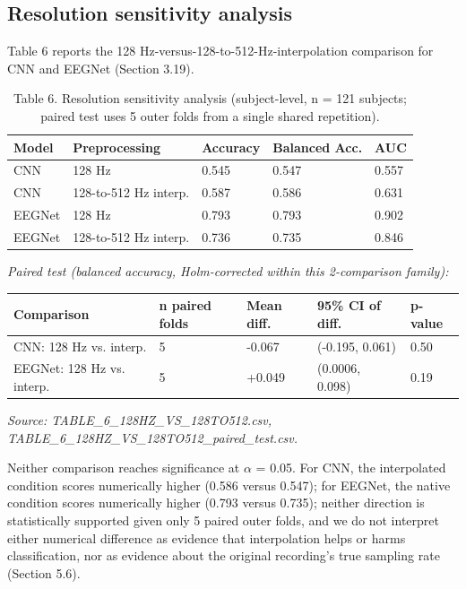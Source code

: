 \documentclass[a4paper,fleqn]{cas-sc}
\begin{document}
\subsection{Resolution sensitivity analysis}

Table 6 reports the 128 Hz-versus-128-to-512-Hz-interpolation comparison for CNN and EEGNet (Section 3.19).



\begin{table}[htbp]
\centering
\small
\caption{Table 6. Resolution sensitivity analysis (subject-level, n = 121 subjects; paired test uses 5 outer folds from a single shared repetition).}
\begin{tabular}{lllll}
\toprule
Model & Preprocessing & Accuracy & Balanced Acc. & AUC \\
\midrule
CNN & 128 Hz & 0.545 & 0.547 & 0.557 \\
CNN & 128-to-512 Hz interp. & 0.587 & 0.586 & 0.631 \\
EEGNet & 128 Hz & 0.793 & 0.793 & 0.902 \\
EEGNet & 128-to-512 Hz interp. & 0.736 & 0.735 & 0.846 \\
\bottomrule
\end{tabular}
\end{table}

\textit{Paired test (balanced accuracy, Holm-corrected within this 2-comparison family):}



\begin{table}[htbp]
\centering
\small
\begin{tabular}{lllll}
\toprule
Comparison & n paired folds & Mean diff. & 95\% CI of diff. & p-value \\
\midrule
CNN: 128 Hz vs. interp. & 5 & -0.067 & (-0.195, 0.061) & 0.50 \\
EEGNet: 128 Hz vs. interp. & 5 & +0.049 & (0.0006, 0.098) & 0.19 \\
\bottomrule
\end{tabular}
\end{table}

\textit{Source: TABLE\_6\_128HZ\_VS\_128TO512.csv, TABLE\_6\_128HZ\_VS\_128TO512\_paired\_test.csv.}



Neither comparison reaches significance at $\alpha$ = 0.05. For CNN, the interpolated condition scores numerically higher (0.586 versus 0.547); for EEGNet, the native condition scores numerically higher (0.793 versus 0.735); neither direction is statistically supported given only 5 paired outer folds, and we do not interpret either numerical difference as evidence that interpolation helps or harms classification, nor as evidence about the original recording's true sampling rate (Section 5.6).
\end{document}
